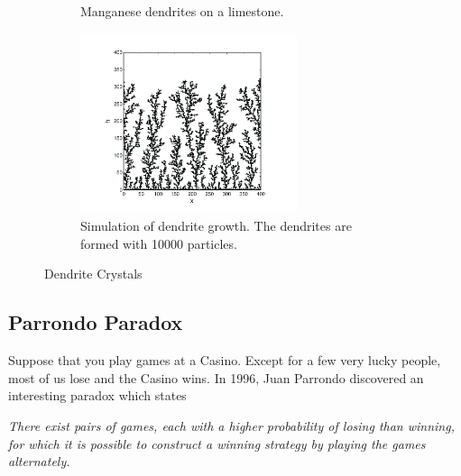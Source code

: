 \begin{figure}
	\centering
	\begin{subfigure}{0.45\textwidth}
		\centering
		\caption{Manganese dendrites on a limestone.}
		\label{fig:dendrites_real}
	\end{subfigure}
	\begin{subfigure}{0.45\textwidth}
		\centering
		\includegraphics[width=2.5in]{16.Random-Walk/dendrites_simulation.pdf}	
		\caption{Simulation of dendrite growth.  The dendrites are formed with 10000 particles.}
		\label{fig:dendrites_simulation}
	\end{subfigure}
	\caption{Dendrite Crystals}\label{fig:dendrites}
\end{figure}



\newpage
\noindent
\subsection{Parrondo Paradox}

Suppose that you play games at a Casino.  Except for a few very lucky people, most of us lose and the Casino wins. In 1996, Juan Parrondo discovered an interesting paradox which states 

\bigskip
\begin{minipage}{6in}
\textit{There exist pairs of games, each with a higher probability of losing than winning, for which it is possible to construct a winning strategy by playing the games alternately.}
\end{minipage}

